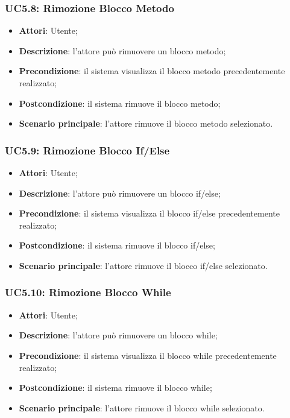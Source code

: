 \begin{itemize}
\begin{itemize}
\begin{itemize}
\begin{itemize}
\subsubsection{UC5.8: Rimozione Blocco Metodo}
\label{UC5.8}
\begin{itemize}
	\item \textbf{Attori}: Utente;
	\item \textbf{Descrizione}: l'attore può rimuovere un blocco metodo;
	\item \textbf{Precondizione}: il sistema visualizza il blocco metodo precedentemente realizzato;
	\item \textbf{Postcondizione}: il sistema rimuove il blocco metodo;
	\item \textbf{Scenario principale}: l'attore rimuove il blocco metodo selezionato.
\end{itemize}

\subsubsection{UC5.9: Rimozione Blocco If/Else}
\label{UC5.9}
\begin{itemize}
	\item \textbf{Attori}: Utente;
	\item \textbf{Descrizione}: l'attore può rimuovere un blocco if/else;
	\item \textbf{Precondizione}: il sistema visualizza il blocco if/else precedentemente realizzato;
	\item \textbf{Postcondizione}: il sistema rimuove il blocco if/else;
	\item \textbf{Scenario principale}: l'attore rimuove il blocco if/else selezionato.
\end{itemize}

\subsubsection{UC5.10: Rimozione Blocco While}
\label{UC5.10}
\begin{itemize}
	\item \textbf{Attori}: Utente;
	\item \textbf{Descrizione}: l'attore può rimuovere un blocco while;
	\item \textbf{Precondizione}: il sistema visualizza il blocco while precedentemente realizzato;
	\item \textbf{Postcondizione}: il sistema rimuove il blocco while;
	\item \textbf{Scenario principale}: l'attore rimuove il blocco while selezionato.
\end{itemize}


\end{itemize}
\end{itemize}
\end{itemize}
\end{itemize}
